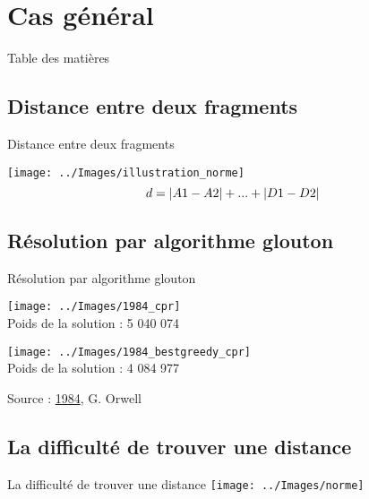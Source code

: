 \documentclass[10pt, aspectratio=43]{beamer}
\begin{document}
	\section{Cas général}

	\begin{frame}{Table des matières}

		
		\tableofcontents[currentsection]
		

	\end{frame}

	\subsection{Distance entre deux fragments}
	\begin{frame}{Distance entre deux fragments}

		
		\centering
		\texttt{[image: ../Images/illustration\_norme]}
		\[ \centering d = |A1 - A2| + ... + |D1 - D2| \]
		

	\end{frame}

	\subsection{Résolution par algorithme glouton}
	\begin{frame}{Résolution par algorithme glouton}
		\centering
	    \begin{minipage}[b]{0.40\textwidth}
	        \centering
	        \vspace{0pt}
	        \texttt{[image: ../Images/1984\_cpr]} \\
	        Poids de la solution : 5 040 074
	    \end{minipage} 
	    \hspace{20pt}
	    \begin{minipage}[b]{0.40\textwidth}
	        \centering
	        \texttt{[image: ../Images/1984\_bestgreedy\_cpr]} \\
	        Poids de la solution : 4 084 977
	    \end{minipage}

	    \footnotesize Source : \underline{1984}, G. Orwell
	\end{frame}

	\subsection{La difficulté de trouver une distance}
	\begin{frame}{La difficulté de trouver une distance}
		\centering
		\texttt{[image: ../Images/norme]}
	\end{frame}
\end{document}

